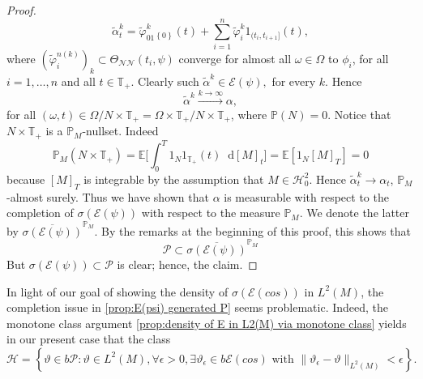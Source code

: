 \documentclass[11pt,a4paper,twoside,openany]{report}
\newcommand{\diff}{\mathop{}\!\mathrm{d}}
\theoremstyle{plain} %
\theoremstyle{definition} %
\theoremstyle{remark} %
\begin{document}
\begin{proof}
   \begin{equation}\label{eq:neural simple processes}
        \widetilde{\alpha}_t^{k} = \widetilde{\varphi}^{k}_01_{\left\{ 0\right\}}(t)+\sum_{i=1}^n \widetilde{\varphi}_i^{k}1_{(t_i,t_{i+1}]}(t),
    \end{equation}
    where \((\widetilde{\varphi}_i^{n(k)})_{k}\subset\Theta_{\mathcal{NN}}(t_i,\psi)\) converge for almost all \(\omega\in\Omega\) to \(\phi_i\), for all \(i=1,\dots,n\) and all \(t\in\mathbb{T}_+\). Clearly such \(\widetilde{\alpha}^{k}\in\mathcal{E}(\psi),\) for every \(k\). Hence
    \begin{equation}
        \widetilde{\alpha}^{k}\overset{k\to\infty}{\to}\alpha,
    \end{equation}
    for all \((\omega,t)\in\Omega/N\times\mathbb{T}_+=\Omega\times\mathbb{T}_+/N\times \mathbb{T}_+\), where \(\mathbb{P}(N)=0\). Notice that  \(N\times\mathbb{T}_+\) is a \(\mathbb{P}_M\)-nullset. Indeed 
    \begin{equation}
        \mathbb{P}_M(N\times\mathbb{T}_+)=\mathbb{E}\bigg[\int_0^{T}1_N1_{\mathbb{T}_+}(t)\diff [M]_t\bigg]=\mathbb{E}[1_N[M]_{T}]=0
    \end{equation}
    because \([M]_{T}\) is integrable by the assumption that \(M\in\mathcal{H}_{0}^2\). Hence \(\widetilde{\alpha}_t^k\to \alpha_t\), \(\mathbb{P}_M\)-almost surely. Thus we have shown that \(\alpha\) is measurable with respect to the completion of \(\sigma(\mathcal{E}(\psi))\) with respect to the measure \(\mathbb{P}_M\). We denote the latter by \(\overline{\sigma(\mathcal{E}(\psi))}^{\mathbb{P}_M}\). By the remarks at the beginning of this proof, this shows that 
     \begin{equation}
        \mathcal{P}\subset\overline{\sigma(\mathcal{E}(\psi))}^{\mathbb{P}_M}
    \end{equation}
    But \(\sigma(\mathcal{E}(\psi))\subset\mathcal{P}\) is clear; hence, the claim. 
\end{proof}
In light of our goal of showing the density of \(\sigma(\mathcal{E}(cos))\) in \(L^2(M)\), the completion issue in \cref{prop:E(psi) generated P} seems problematic. Indeed, the monotone class argument \cref{prop:density of E in L2(M) via monotone class} yields in our present case that the class 
\begin{equation}
     \mathcal{H}=\left\{ \vartheta\in b\mathcal{P}:\vartheta\in L^2(M),\forall \epsilon>0, \exists \vartheta_{\epsilon}\in b\mathcal{E}(cos)\text{ with }\lVert \vartheta_{\epsilon}-\vartheta\rVert_{L^2(M)}<\epsilon\right\}.
\end{equation}
\end{document}
